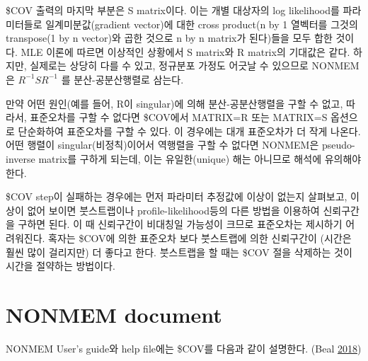 \documentclass[
  10pt,
  krantz2,
  a4paper]{krantz}
\theoremstyle{definition}
\theoremstyle{definition}
\theoremstyle{definition}
\theoremstyle{remark}
\begin{document}
\$COV 출력의 마지막 부분은 S matrix이다. 이는 개별 대상자의 log likelihood를 파라미터들로 일계미분값(gradient vector)에 대한 cross product(n by 1 열벡터를 그것의 transpose(1 by n vector)와 곱한 것으로 n by n matrix가 된다)들을 모두 합한 것이다. MLE 이론에 따르면 이상적인 상황에서 S matrix와 R matrix의 기대값은 같다. 하지만, 실제로는 상당히 다를 수 있고, 정규분포 가정도 어긋날 수 있으므로 NONMEM은 \(R^{- 1}SR^{- 1}\) 를 분산-공분산행렬로 삼는다.

만약 어떤 원인(예를 들어, R이 singular)에 의해 분산-공분산행렬을 구할 수 없고, 따라서, 표준오차를 구할 수 없다면 \$COV에서 MATRIX=R 또는 MATRIX=S 옵션으로 단순화하여 표준오차를 구할 수 있다. 이 경우에는 대개 표준오차가 더 작게 나온다. 어떤 행렬이 singular(비정칙)이어서 역행렬을 구할 수 없다면 NONMEM은 pseudo-inverse matrix를 구하게 되는데, 이는 유일한(unique) 해는 아니므로 해석에 유의해야 한다.

\$COV step이 실패하는 경우에는 먼저 파라미터 추정값에 이상이 없는지 살펴보고, 이상이 없어 보이면 붓스트랩이나 profile-likelihood등의 다른 방법을 이용하여 신뢰구간을 구하면 된다. 이 때 신뢰구간이 비대칭일 가능성이 크므로 표준오차는 제시하기 어려워진다. 혹자는 \$COV에 의한 표준오차 보다 붓스트랩에 의한 신뢰구간이 (시간은 훨씬 많이 걸리지만) 더 좋다고 한다. 붓스트랩을 할 때는 \$COV 절을 삭제하는 것이 시간을 절약하는 방법이다.

\hypertarget{nonmem-document}{%
\section{NONMEM document}\label{nonmem-document}}

NONMEM User's guide와 help file에는 \$COV를 다음과 같이 설명한다. (Beal \protect\hyperlink{ref-nonmem}{2018})
\end{document}

